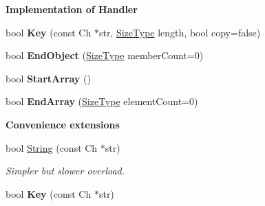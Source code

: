 \begin{Indent}{\bf Implementation of Handler}
\begin{DoxyCompactItemize}
\item 
bool {\bfseries Key} (const Ch $\ast$str, \hyperlink{rapidjson_8h_a5ed6e6e67250fadbd041127e6386dcb5}{Size\+Type} length, bool copy=false)\hypertarget{class_writer_a88f8aa2df45426ba81d293ddc71698af}{}\label{class_writer_a88f8aa2df45426ba81d293ddc71698af}

\item 
bool {\bfseries End\+Object} (\hyperlink{rapidjson_8h_a5ed6e6e67250fadbd041127e6386dcb5}{Size\+Type} member\+Count=0)\hypertarget{class_writer_a3705f6d3f9a820f0a6652089222ed3ac}{}\label{class_writer_a3705f6d3f9a820f0a6652089222ed3ac}

\item 
bool {\bfseries Start\+Array} ()\hypertarget{class_writer_a8a981ed4f5618a545724789ee4c8dedb}{}\label{class_writer_a8a981ed4f5618a545724789ee4c8dedb}

\item 
bool {\bfseries End\+Array} (\hyperlink{rapidjson_8h_a5ed6e6e67250fadbd041127e6386dcb5}{Size\+Type} element\+Count=0)\hypertarget{class_writer_ad8680f9f8d3289dad72f1f18a8763aa1}{}\label{class_writer_ad8680f9f8d3289dad72f1f18a8763aa1}

\end{DoxyCompactItemize}
\end{Indent}
\begin{Indent}{\bf Convenience extensions}\par
\begin{DoxyCompactItemize}
\item 
bool \hyperlink{class_writer_ad1525690e1d598d7e32892b8b83fbcd4}{String} (const Ch $\ast$str)\hypertarget{class_writer_ad1525690e1d598d7e32892b8b83fbcd4}{}\label{class_writer_ad1525690e1d598d7e32892b8b83fbcd4}

\begin{DoxyCompactList}\small\item\em Simpler but slower overload. \end{DoxyCompactList}\item 
bool {\bfseries Key} (const Ch $\ast$str)\hypertarget{class_writer_a77dbb4676e57aab1c0e976ec22145fb9}{}\label{class_writer_a77dbb4676e57aab1c0e976ec22145fb9}

\end{DoxyCompactItemize}
\end{Indent}
